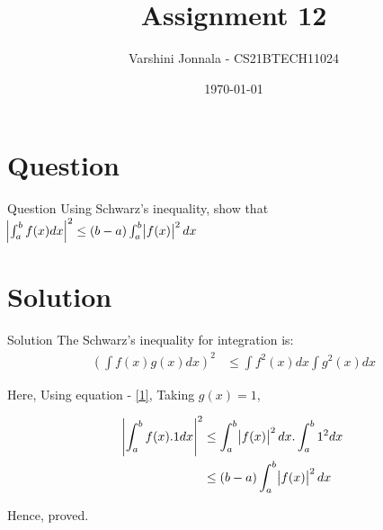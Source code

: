 \documentclass{beamer}
\title{Assignment 12}
\author{Varshini Jonnala - CS21BTECH11024}
\date{\today}
\providecommand{\brak}[1]{\ensuremath{\left(#1\right)}}
\begin{document}
\begin{frame}
    \titlepage 
\end{frame}

\section{Question}
\begin{frame}{Question}
Using Schwarz's inequality, show that 
$\abs {\int_a^b f(x) dx}^2 \leq \brak{b-a} \int_a^b \abs{f(x)}^2 dx$
\end{frame}

\section{Solution}
\begin{frame}[allowframebreaks]{Solution}
The Schwarz's inequality for integration is:
    \begin{align}
        \brak{\int f(x)g(x)dx}^2 &\leq \int f^2(x)dx \int g^2(x)dx \label{1}
    \end{align}
    
    Here, Using equation - \eqref{1}, Taking $g(x) = 1$, 
    
    \begin{align}
        \abs{\int_a^b f(x).1 dx}^2 &\leq \int_a^b \abs{f(x)}^2 dx .\int_a^b 1^2 dx\\
        &\leq \brak{b-a} \int_a^b \abs{f(x)}^2 dx
    \end{align}
    
    Hence, proved. 
\end{frame}
\end{document}
